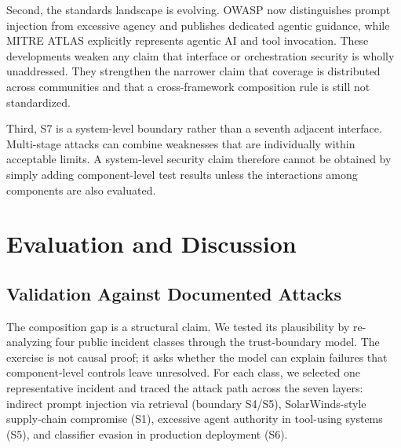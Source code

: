 \documentclass[runningheads]{llncs}
\begin{document}
Second, the standards landscape is evolving. OWASP now distinguishes prompt injection from excessive agency and publishes dedicated agentic guidance, while MITRE ATLAS explicitly represents agentic AI and tool invocation. These developments weaken any claim that interface or orchestration security is wholly unaddressed. They strengthen the narrower claim that coverage is distributed across communities and that a cross-framework composition rule is still not standardized.

Third, S7 is a system-level boundary rather than a seventh adjacent interface. Multi-stage attacks can combine weaknesses that are individually within acceptable limits. A system-level security claim therefore cannot be obtained by simply adding component-level test results unless the interactions among components are also evaluated.

\section{Evaluation and Discussion}
\label{sec:evaluation}

\subsection{Validation Against Documented Attacks}
\label{sec:validation}

The composition gap is a structural claim. We tested its plausibility by re-analyzing four public incident classes through the trust-boundary model. The exercise is not causal proof; it asks whether the model can explain failures that component-level controls leave unresolved. For each class, we selected one representative incident and traced the attack path across the seven layers: indirect prompt injection via retrieval (boundary S4/S5), SolarWinds-style supply-chain compromise (S1), excessive agent authority in tool-using systems (S5), and classifier evasion in production deployment (S6).
\end{document}
